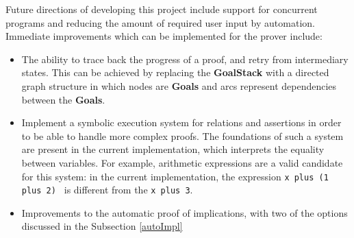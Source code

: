 \documentclass[12pt,a4paper]{article}
\begin{document}
{Future directions of developing this project include support for concurrent programs and reducing the amount of required user input by automation. Immediate improvements which can be implemented for the prover include:
\begin{itemize}
	\item The ability to trace back the progress of a proof, and retry from intermediary states. This can be achieved by replacing the \textbf{GoalStack} with a directed graph structure in which nodes are \textbf{Goals} and arcs represent dependencies between the \textbf{Goals}.
	\item Implement a symbolic execution system for relations and assertions in order to be able to handle more complex proofs. The foundations of such a system are present in the current implementation, which interprets the equality between variables. For example, arithmetic expressions are a valid candidate for this system: in the current implementation, the expression \texttt{x plus (1 plus 2) } is different from the \texttt{x plus 3}.
	\item Improvements to the automatic proof of implications, with two of the options discussed in the Subsection \ref{autoImpl}
\end{itemize}





\begin{appendices}

\end{appendices}}
\end{document}
